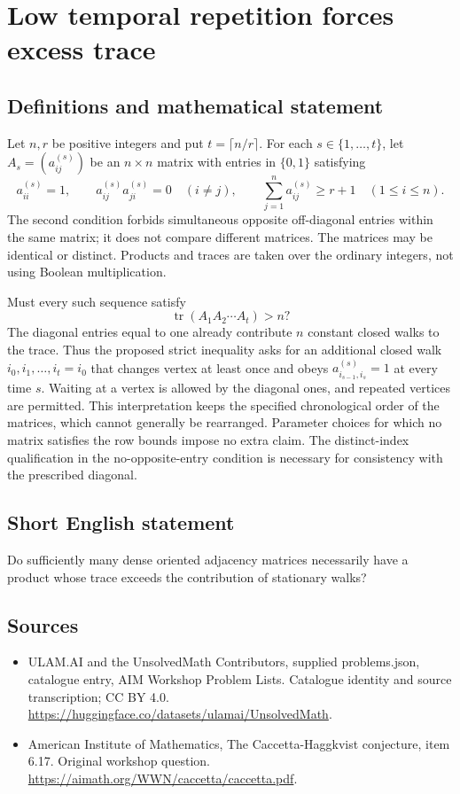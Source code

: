 \documentclass[11pt,a4paper]{article}
\begin{document}
\section*{Low temporal repetition forces excess trace}\label{statement}

\subsection{Definitions and mathematical statement}
Let $n,r$ be positive integers and put $t=\lceil n/r\rceil$.
For each $s\in\{1,\ldots,t\}$, let $A_s=(a^{(s)}_{ij})$ be an $n\times n$ matrix with entries in $\{0,1\}$ satisfying
\[
 a^{(s)}_{ii}=1,\qquad
 a^{(s)}_{ij}a^{(s)}_{ji}=0\quad(i\ne j),\qquad
 \sum_{j=1}^n a^{(s)}_{ij}\geq r+1\quad(1\leq i\leq n).
\]
The second condition forbids simultaneous opposite off-diagonal entries within the same matrix; it does not compare different matrices.
The matrices may be identical or distinct.
Products and traces are taken over the ordinary integers, not using Boolean multiplication.

Must every such sequence satisfy
\[
 \operatorname{tr}(A_1A_2\cdots A_t)>n?
\]
The diagonal entries equal to one already contribute $n$ constant closed walks to the trace.
Thus the proposed strict inequality asks for an additional closed walk
$i_0,i_1,\ldots,i_t=i_0$ that changes vertex at least once and obeys
$a^{(s)}_{i_{s-1},i_s}=1$ at every time $s$.
Waiting at a vertex is allowed by the diagonal ones, and repeated vertices are permitted.
This interpretation keeps the specified chronological order of the matrices, which cannot generally be rearranged.
Parameter choices for which no matrix satisfies the row bounds impose no extra claim.
The distinct-index qualification in the no-opposite-entry condition is necessary for consistency with the prescribed diagonal.
\subsection{Short English statement}
Do sufficiently many dense oriented adjacency matrices necessarily have a product whose trace exceeds the contribution of stationary walks?
\subsection{Sources}
\begin{itemize}
\item[S1] ULAM.AI and the UnsolvedMath Contributors, supplied problems.json, catalogue entry, AIM Workshop Problem Lists. Catalogue identity and source transcription; CC BY 4.0.
\url{https://huggingface.co/datasets/ulamai/UnsolvedMath}.
\item[S2] American Institute of Mathematics, The Caccetta-Haggkvist conjecture, item 6.17. Original workshop question.
\url{https://aimath.org/WWN/caccetta/caccetta.pdf}.
\end{itemize}
\end{document}
